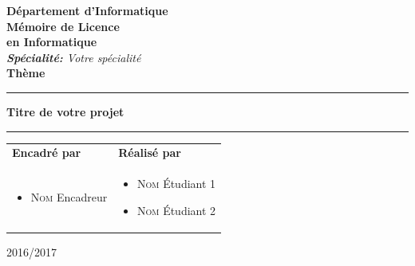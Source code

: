 \begin{titlepage}
\begin{center}
{ \textbf{D\'epartement d'Informatique}}\\ \vspace{0.8cm}
\Huge{\textbf{Mémoire de Licence}} \\ \Large{\textbf{en Informatique}} \\\vspace{0.3cm}
\large{\emph{\textbf{Spécialité:} Votre spécialité}}\\ \vspace{0.8cm}
\huge{\textbf{Thème}}\\ %
\noindent\rule{\textwidth}{1mm}
\Large{\textbf{Titre de votre projet}}
\noindent\rule{\textwidth}{1mm}
\end{center}
\vspace{0.3cm}
\begin{tabular}{ p{9cm}  p{6cm} }
\textbf{Encadré par} & \textbf{Réalisé par} \\
\begin{itemize}
	\item \textsc{Nom} Encadreur
\end{itemize}
&
\begin{itemize}
	\item \textsc{Nom} Étudiant 1
	\item \textsc{Nom} Étudiant 2
\end{itemize}
\\
\end{tabular}
\vspace{3.5cm}
\begin{center}
2016/2017
\end{center}

\end{titlepage}